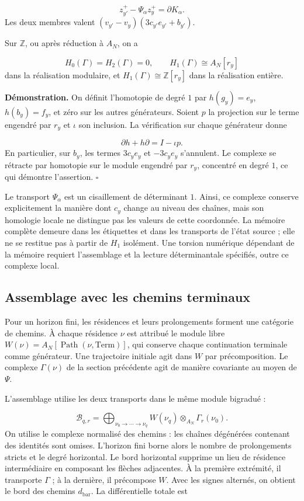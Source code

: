 \[
z^+_{y'}-\Psi_\alpha z^+_y=\partial K_\alpha.
\]
Les deux membres valent \((v_{y'}-v_y)(3c_{y'}e_{y'}+b_{y'})\).

Sur \(\mathbb Z\), ou après réduction à \(A_N\), on a

\[
H_0(\Gamma)=H_2(\Gamma)=0,
\qquad H_1(\Gamma)\cong A_N[r_y]
\]
dans la réalisation modulaire, et \(H_1(\Gamma)\cong\mathbb Z[r_y]\) dans la réalisation entière.

\textbf{Démonstration.} On définit l’homotopie de degré \(1\) par \(h(g_y)=e_y\), \(h(b_y)=f_y\), et zéro sur les autres générateurs. Soient \(p\) la projection sur le terme engendré par \(r_y\) et \(\iota\) son inclusion. La vérification sur chaque générateur donne

\[
\partial h+h\partial=I-\iota p.
\]
En particulier, sur \(b_y\), les termes \(3c_ye_y\) et \(-3c_ye_y\) s’annulent. Le complexe se rétracte par homotopie sur le module engendré par \(r_y\), concentré en degré \(1\), ce qui démontre l’assertion. \hfill\(\square\)

Le transport \(\Psi_\alpha\) est un cisaillement de déterminant \(1\). Ainsi, ce complexe conserve explicitement la manière dont \(c_y\) change au niveau des chaînes, mais son homologie locale ne distingue pas les valeurs de cette coordonnée. La mémoire complète demeure dans les étiquettes et dans les transports de l'état source ; elle ne se restitue pas à partir de \(H_1\) isolément. Une torsion numérique dépendant de la mémoire requiert l'assemblage et la lecture déterminantale spécifiés, outre ce complexe local.

\subsection{Assemblage avec les chemins terminaux}
Pour un horizon fini, les résidences et leurs prolongements forment une catégorie de chemins. À chaque résidence \(\nu\) est attribué le module libre \(W(\nu)=A_N[\operatorname{Path}(\nu,\mathrm{Term})]\), qui conserve chaque continuation terminale comme générateur. Une trajectoire initiale agit dans \(W\) par précomposition. Le complexe \(\Gamma(\nu)\) de la section précédente agit de manière covariante au moyen de \(\Psi\).

L'assemblage utilise les deux transports dans le même module bigradué :

\[
\mathcal B_{q,r}=
\bigoplus_{\nu_0\to\cdots\to\nu_q}
W(\nu_q)\otimes_{A_N}\Gamma_r(\nu_0).
\]
On utilise le complexe normalisé des chemins : les chaînes dégénérées contenant des identités sont omises. L'horizon fini borne alors le nombre de prolongements stricts et le degré horizontal. Le bord horizontal supprime un lieu de résidence intermédiaire en composant les flèches adjacentes. À la première extrémité, il transporte \(\Gamma\) ; à la dernière, il précompose \(W\). Avec les signes alternés, on obtient le bord des chemins \(d_{\mathrm{bar}}\). La différentielle totale est

